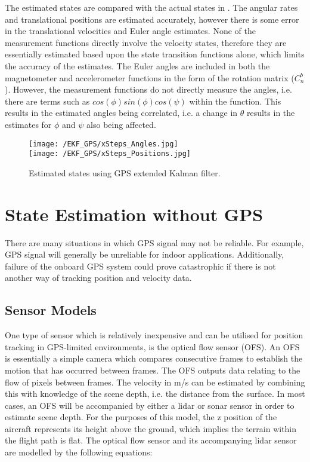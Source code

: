 The estimated states are compared with the actual states in . The angular rates and translational positions are estimated accurately, however there is some error in the translational velocities and Euler angle estimates. None of the measurement functions directly involve the velocity states, therefore they are essentially estimated based upon the state transition functions alone, which limits the accuracy of the estimates. The Euler angles are included in both the magnetometer and accelerometer functions in the form of the rotation matrix ($C_{n}^{b}$). However, the measurement functions do not directly measure the angles, i.e. there are terms such as $cos(\phi)sin(\phi)cos(\psi)$ within the function. This results in the estimated angles being correlated, i.e. a change in $\theta$ results in the estimates for $\phi$ and $\psi$ also being affected.

\begin{figure}[htb]
\begin{center}
	\texttt{[image: /EKF\_GPS/xSteps\_Angles.jpg]}\\
	\texttt{[image: /EKF\_GPS/xSteps\_Positions.jpg]}
	\end{center}
	\caption{Estimated states using GPS extended Kalman filter.}%
	\label{fig:GPS_EKF_Results}%
\end{figure}


\FloatBarrier
\section{State Estimation without GPS}
There are many situations in which GPS signal may not be reliable. For example, GPS signal will generally be unreliable for indoor applications. Additionally, failure of the onboard GPS system could prove catastrophic if there is not another way of tracking position and velocity data.
\subsection{Sensor Models}\label{section:GPSSensModels}
One type of sensor which is relatively inexpensive and can be utilised for position tracking in GPS-limited environments, is the optical flow sensor (OFS). An OFS is essentially a simple camera which compares consecutive frames to establish the motion that has occurred between frames. The OFS outputs data relating to the flow of pixels between frames. The velocity in m/s can be estimated by combining this with knowledge of the scene depth, i.e. the distance from the surface. In most cases, an OFS will be accompanied by either a lidar or sonar sensor in order to estimate scene depth. For the purposes of this model, the z position of the aircraft represents its height above the ground, which implies the terrain within the flight path is flat. The optical flow sensor and its accompanying lidar sensor are modelled by the following equations\cite{Driessen2018}\cite{Ding2010}:


